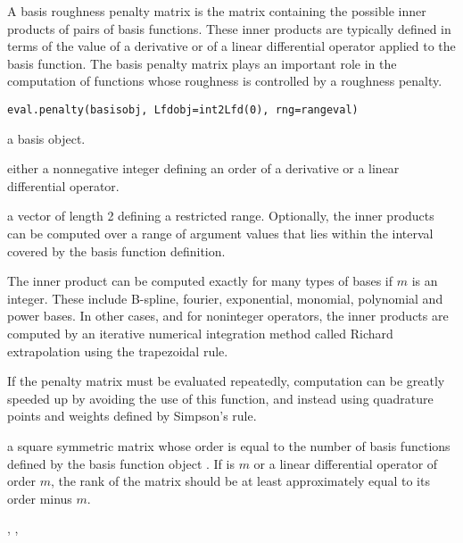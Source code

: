 \documentclass{article}
\begin{document}
\begin{Description}\relax
A basis roughness penalty matrix is the matrix containing
the possible inner products of pairs of basis functions.
These inner products are typically defined in terms of
the value of a derivative or of a linear differential
operator applied to the basis function.  The basis penalty
matrix plays an important role in the computation of
functions whose roughness is controlled by a roughness
penalty.
\end{Description}
\begin{Usage}
\begin{verbatim}
eval.penalty(basisobj, Lfdobj=int2Lfd(0), rng=rangeval)
\end{verbatim}
\end{Usage}
\begin{Arguments}
\begin{ldescription}
\item[\code{basisobj}] a basis object.
\item[\code{Lfdobj}] either a nonnegative integer defining an order of a
derivative or a linear differential operator.

\item[\code{rng}] a vector of length 2 defining a restricted range.
Optionally, the inner products can be computed over
a range of argument values that lies within the
interval covered by the basis function definition.

\end{ldescription}
\end{Arguments}
\begin{Details}\relax
The inner product can be computed exactly for many
types of bases if $m$ is an integer.  These include
B-spline, fourier, exponential, monomial, polynomial and power bases.
In other cases, and for noninteger operators, the
inner products are computed by an iterative numerical
integration method called Richard extrapolation using the
trapezoidal rule.

If the penalty matrix must be evaluated repeatedly,
computation can be greatly speeded up by avoiding the use
of this function, and instead using quadrature points and
weights defined by Simpson's rule.
\end{Details}
\begin{Value}
a square symmetric matrix whose order is equal
to the number of basis functions defined by
the basis function object .
If  is $m$ or a linear
differential operator of order $m$, the rank
of the matrix should be at least approximately equal to
its order minus  $m$.
\end{Value}
\begin{SeeAlso}\relax
{}, 
,
\end{SeeAlso}
\end{document}
